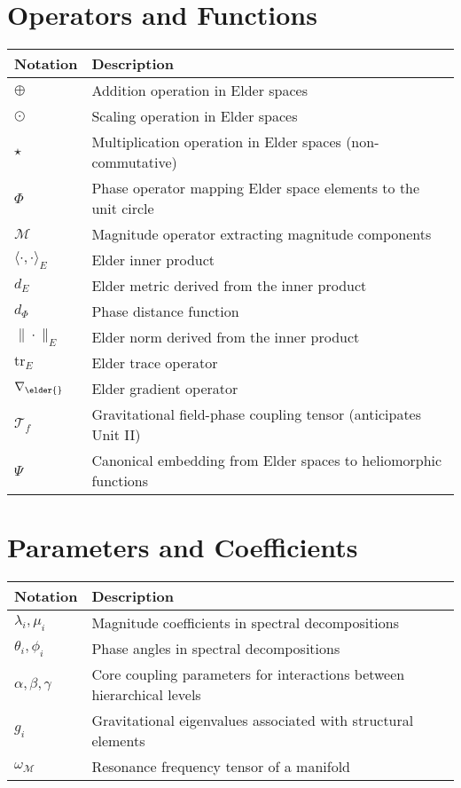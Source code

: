\section*{Operators and Functions}

\begin{tabular}{p{}p{}}
\textbf{Notation} & \textbf{Description} \\
\hline
$\oplus$ & Addition operation in Elder spaces \\
$\odot$ & Scaling operation in Elder spaces \\
$\star$ & Multiplication operation in Elder spaces (non-commutative) \\
$\Phi$ & Phase operator mapping Elder space elements to the unit circle \\
$\mathcal{M}$ & Magnitude operator extracting magnitude components \\
$\langle \cdot, \cdot \rangle_E$ & Elder inner product \\
$d_E$ & Elder metric derived from the inner product \\
$d_{\Phi}$ & Phase distance function \\
$\|\cdot\|_E$ & Elder norm derived from the inner product \\
$\mathrm{tr}_E$ & Elder trace operator \\
$\nabla_{\elder{}}$ & Elder gradient operator \\
$\mathcal{T}_f$ & Gravitational field-phase coupling tensor (anticipates Unit II) \\
$\Psi$ & Canonical embedding from Elder spaces to heliomorphic functions \\
\hline
\end{tabular}

\section*{Parameters and Coefficients}

\begin{tabular}{p{}p{}}
\textbf{Notation} & \textbf{Description} \\
\hline
$\lambda_i, \mu_i$ & Magnitude coefficients in spectral decompositions \\
$\theta_i, \phi_i$ & Phase angles in spectral decompositions \\
$\alpha, \beta, \gamma$ & Core coupling parameters for interactions between hierarchical levels \\
$g_i$ & Gravitational eigenvalues associated with structural elements \\
$\omega_{\mathcal{M}}$ & Resonance frequency tensor of a manifold \\
\hline
\end{tabular}

